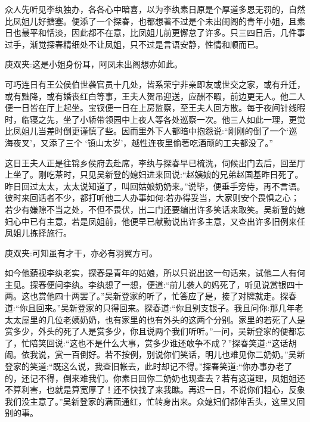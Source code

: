 \begin{parag}
    众人先听见李纨独办，各各心中暗喜，以为李纨素日原是个厚道多恩无罚的，自然比凤姐儿好搪塞。便添了一个探春，也都想著不过是个未出闺阁的青年小姐，且素日也最平和恬淡，因此都不在意，比凤姐儿前更懈怠了许多。只三四日后，几件事过手，渐觉探春精细处不让凤姐，只不过是言语安静，性情和顺而已。\begin{note}庚双夹:这是小姐身份耳，阿凤未出阁想亦如此。\end{note}可巧连日有王公侯伯世袭官员十几处，皆系荣宁非亲即友或世交之家，或有升迁，或有黜降，或有婚丧红白等事，王夫人贺吊迎送，应酬不暇，前边更无人。他二人便一日皆在厅上起坐。宝钗便一日在上房监察，至王夫人回方散。每于夜间针线暇时，临寝之先，坐了小轿带领园中上夜人等各处巡察一次。他三人如此一理，更觉比凤姐儿当差时倒更谨慎了些。因而里外下人都暗中抱怨说:“刚刚的倒了一个‘巡海夜叉’，又添了三个 ‘镇山太岁’，越性连夜里偷著吃酒顽的工夫都没了。”
\end{parag}


\begin{parag}
    这日王夫人正是往锦乡侯府去赴席，李纨与探春早已梳洗，伺候出门去后，回至厅上坐了。刚吃茶时，只见吴新登的媳妇进来回说:“赵姨娘的兄弟赵国基昨日死了。昨日回过太太，太太说知道了，叫回姑娘奶奶来。”说毕，便垂手旁侍，再不言语。彼时来回话者不少，都打听他二人办事如何:若办得妥当，大家则安个畏惧之心；若少有嫌隙不当之处，不但不畏伏，出二门还要编出许多笑话来取笑。吴新登的媳妇心中已有主意，若是凤姐前，他便早已献勤说出许多主意，又查出许多旧例来任凤姐儿拣择施行。\begin{note}庚双夹:可知虽有才干，亦必有羽翼方可。\end{note}如今他藐视李纨老实，探春是青年的姑娘，所以只说出这一句话来，试他二人有何主见。探春便问李纨。李纨想了一想，便道:“前儿袭人的妈死了，听见说赏银四十两。这也赏他四十两罢了。”吴新登家的听了，忙答应了是，接了对牌就走。探春道:“你且回来。”吴新登家的只得回来。探春道:“你且别支银子。我且问你:那几年老太太屋里的几位老姨奶奶，也有家里的也有外头的这两个分别。家里的若死了人是赏多少，外头的死了人是赏多少，你且说两个我们听听。”一问，吴新登家的便都忘了，忙陪笑回说:“这也不是什么大事，赏多少谁还敢争不成？”探春笑道:“这话胡闹。依我说，赏一百倒好。若不按例，别说你们笑话，明儿也难见你二奶奶。”吴新登家的笑道:“既这么说，我查旧帐去，此时却记不得。”探春笑道:“你办事办老了的，还记不得，倒来难我们。你素日回你二奶奶也现查去？若有这道理，凤姐姐还不算利害，也就是算宽厚了！还不快找了来我瞧。再迟一日，不说你们粗心，反象我们没主意了。”吴新登家的满面通红，忙转身出来。众媳妇们都伸舌头，这里又回别的事。
\end{parag}


